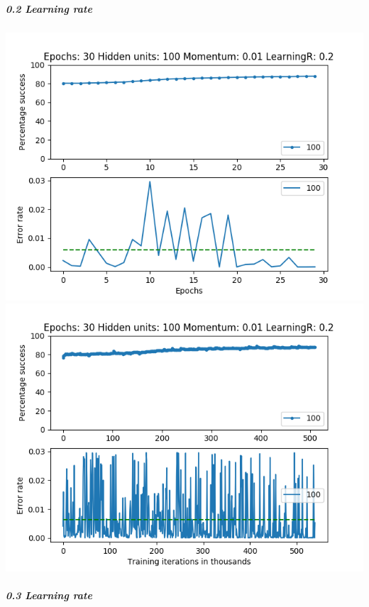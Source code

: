 \documentclass[11pt]{article}
\makeatletter
\def\maxwidth{\ifdim\Gin@nat@width>\linewidth\linewidth
    \else\Gin@nat@width\fi}
\let\Oldincludegraphics\includegraphics
\renewcommand{\includegraphics}[1]{\Oldincludegraphics[width=.8\maxwidth]{#1}}
\makeatother
\begin{document}
\hypertarget{learning-rate-2}{%
\subparagraph{0.2 Learning rate}\label{learning-rate-2}}

\includegraphics{Experiment2/E2_NN_Epoch_Momentum_0.01_30Epochs_100_LR_0.2_Hiddenunits.png}
\includegraphics{Experiment2/E2_NN_Training_Momentum_0.01_30Epochs_100_LR_0.2_Hiddenunits.png}

\hypertarget{learning-rate-3}{%
\subparagraph{0.3 Learning rate}\label{learning-rate-3}}
\end{document}
